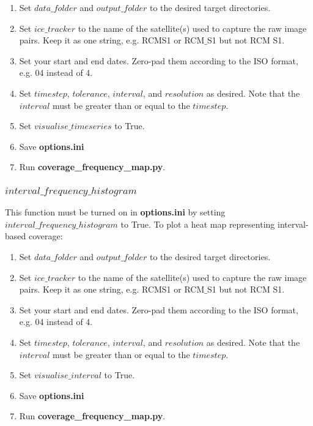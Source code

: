 \documentclass{article}
\begin{document}
            \begin{enumerate}
                \item Set $data\_folder$ and $output\_folder$ to the desired target directories.
                \item Set $ice\_tracker$ to the name of the satellite(s) used to capture the raw image pairs. Keep it as one string, e.g. RCMS1 or RCM$\_$S1 but not RCM S1.
                \item Set your start and end dates. Zero-pad them according to the ISO format, e.g. 04 instead of 4.
                \item Set $timestep$, $tolerance$, $interval$, and $resolution$ as desired. Note that the $interval$ must be greater than or equal to the $timestep$.
                \item Set $visualise\_timeseries$ to True.
                \item Save \textbf{options.ini}
                \item Run \textbf{coverage\_frequency\_map.py}.
            \end{enumerate}

        \subsubsection*{$interval\_frequency\_histogram$}

            This function must be turned on in \textbf{options.ini} by setting $interval\_frequency\_histogram$ to True. To plot a heat map representing interval-based coverage:

            \begin{enumerate}
                \item Set $data\_folder$ and $output\_folder$ to the desired target directories.
                \item Set $ice\_tracker$ to the name of the satellite(s) used to capture the raw image pairs. Keep it as one string, e.g. RCMS1 or RCM$\_$S1 but not RCM S1.
                \item Set your start and end dates. Zero-pad them according to the ISO format, e.g. 04 instead of 4.
                \item Set $timestep$, $tolerance$, $interval$, and $resolution$ as desired. Note that the $interval$ must be greater than or equal to the $timestep$.
                \item Set $visualise\_interval$ to True.
                \item Save \textbf{options.ini}
                \item Run \textbf{coverage\_frequency\_map.py}.
            \end{enumerate}
\end{document}
